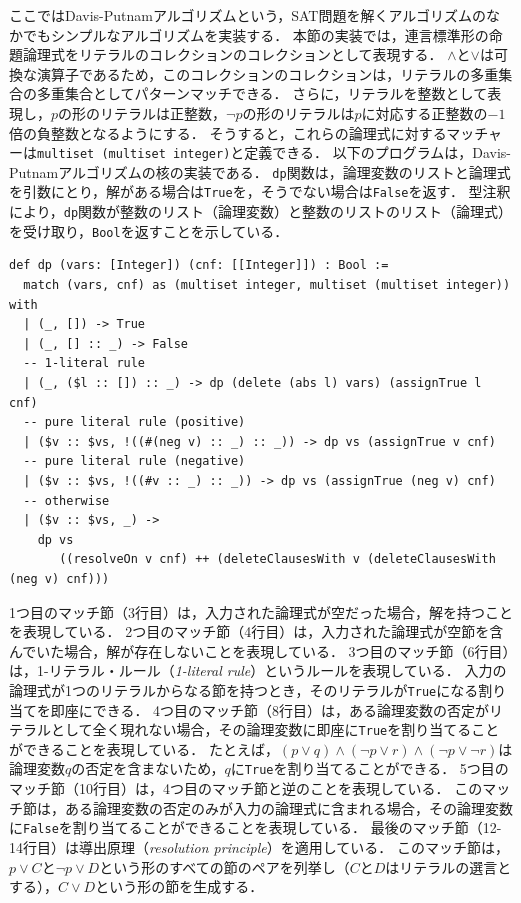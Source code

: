 ここではDavis-Putnamアルゴリズム\cite{harrison2009handbook}という，SAT問題を解くアルゴリズムのなかでもシンプルなアルゴリズムを実装する．
本節の実装では，連言標準形の命題論理式をリテラルのコレクションのコレクションとして表現する．
$\wedge$と$\lor$は可換な演算子であるため，このコレクションのコレクションは，リテラルの多重集合の多重集合としてパターンマッチできる．
さらに，リテラルを整数として表現し，$p$の形のリテラルは正整数，$\neg p$の形のリテラルは$p$に対応する正整数の$-1$倍の負整数となるようにする．
そうすると，これらの論理式に対するマッチャーは\lstinline{multiset (multiset integer)}と定義できる．
以下のプログラムは，Davis-Putnamアルゴリズムの核の実装である．
\lstinline{dp}関数は，論理変数のリストと論理式を引数にとり，解がある場合は\lstinline{True}を，そうでない場合は\lstinline{False}を返す．
型注釈により，\lstinline{dp}関数が整数のリスト（論理変数）と整数のリストのリスト（論理式）を受け取り，\lstinline{Bool}を返すことを示している．
\begin{lstlisting}[language=egison]
def dp (vars: [Integer]) (cnf: [[Integer]]) : Bool :=
  match (vars, cnf) as (multiset integer, multiset (multiset integer)) with
  | (_, []) -> True
  | (_, [] :: _) -> False
  -- 1-literal rule
  | (_, ($l :: []) :: _) -> dp (delete (abs l) vars) (assignTrue l cnf)
  -- pure literal rule (positive)
  | ($v :: $vs, !((#(neg v) :: _) :: _)) -> dp vs (assignTrue v cnf)
  -- pure literal rule (negative)
  | ($v :: $vs, !((#v :: _) :: _)) -> dp vs (assignTrue (neg v) cnf)
  -- otherwise
  | ($v :: $vs, _) ->
    dp vs
       ((resolveOn v cnf) ++ (deleteClausesWith v (deleteClausesWith (neg v) cnf)))
\end{lstlisting}
1つ目のマッチ節（3行目）は，入力された論理式が空だった場合，解を持つことを表現している．
2つ目のマッチ節（4行目）は，入力された論理式が空節を含んでいた場合，解が存在しないことを表現している．
3つ目のマッチ節（6行目）は，1-リテラル・ルール（\emph{1-literal rule}）というルールを表現している．
入力の論理式が1つのリテラルからなる節を持つとき，そのリテラルが\lstinline{True}になる割り当てを即座にできる．
4つ目のマッチ節（8行目）は，ある論理変数の否定がリテラルとして全く現れない場合，その論理変数に即座に\lstinline{True}を割り当てることができることを表現している．
たとえば，$(p \lor q) \wedge (\neg p \lor r) \wedge (\neg p \lor \neg r)$は論理変数$q$の否定を含まないため，$q$に\lstinline{True}を割り当てることができる．
5つ目のマッチ節（10行目）は，4つ目のマッチ節と逆のことを表現している．
このマッチ節は，ある論理変数の否定のみが入力の論理式に含まれる場合，その論理変数に\lstinline{False}を割り当てることができることを表現している．
最後のマッチ節（12-14行目）は導出原理（\emph{resolution principle}）を適用している．
このマッチ節は，$p \lor C$と$\neg p \lor D$という形のすべての節のペアを列挙し（$C$と$D$はリテラルの選言とする），$C \lor D$という形の節を生成する．

